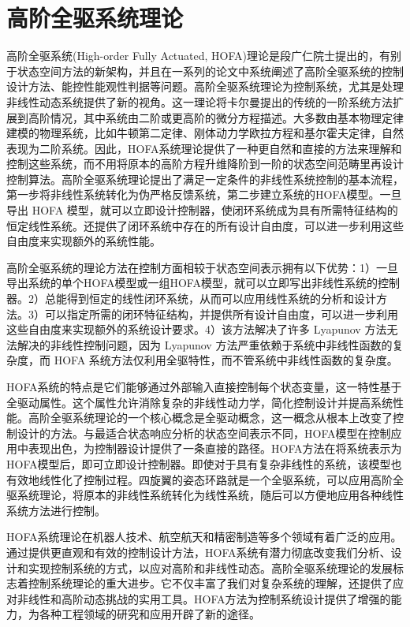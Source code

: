\section{高阶全驱系统理论}
高阶全驱系统(High-order Fully Actuated, HOFA)理论是段广仁院士提出的，有别于状态空间方法的新架构\cite{duan1}\cite{duan2}\cite{duan3}\cite{duan4}\cite{duan5}，并且在一系列的论文中系统阐述了高阶全驱系统的控制设计方法、能控性能观性判据等问题\cite{段1}\cite{段2}。高阶全驱系统理论为控制系统，尤其是处理非线性动态系统提供了新的视角。这一理论将卡尔曼提出的传统的一阶系统方法扩展到高阶情况，其中系统由二阶或更高阶的微分方程描述。大多数由基本物理定律建模的物理系统，比如牛顿第二定律、刚体动力学欧拉方程和基尔霍夫定律，自然表现为二阶系统。因此，HOFA系统理论提供了一种更自然和直接的方法来理解和控制这些系统，而不用将原本的高阶方程升维降阶到一阶的状态空间范畴里再设计控制算法。高阶全驱系统理论提出了满足一定条件的非线性系统控制的基本流程，第一步将非线性系统转化为伪严格反馈系统，第二步建立系统的HOFA模型。一旦导出 HOFA 模型，就可以立即设计控制器，使闭环系统成为具有所需特征结构的恒定线性系统。还提供了闭环系统中存在的所有设计自由度，可以进一步利用这些自由度来实现额外的系统性能。

高阶全驱系统的理论方法在控制方面相较于状态空间表示拥有以下优势：1）一旦导出系统的单个HOFA模型或一组HOFA模型，就可以立即写出非线性系统的控制器。2）总能得到恒定的线性闭环系统，从而可以应用线性系统的分析和设计方法。3）可以指定所需的闭环特征结构，并提供所有设计自由度，可以进一步利用这些自由度来实现额外的系统设计要求。4）该方法解决了许多 Lyapunov 方法无法解决的非线性控制问题，因为 Lyapunov 方法严重依赖于系统中非线性函数的复杂度，而 HOFA 系统方法仅利用全驱特性，而不管系统中非线性函数的复杂度。

HOFA系统的特点是它们能够通过外部输入直接控制每个状态变量，这一特性基于全驱动属性。这个属性允许消除复杂的非线性动力学，简化控制设计并提高系统性能。高阶全驱系统理论的一个核心概念是全驱动概念，这一概念从根本上改变了控制设计的方法。与最适合状态响应分析的状态空间表示不同，HOFA模型在控制应用中表现出色，为控制器设计提供了一条直接的路径。HOFA方法在将系统表示为HOFA模型后，即可立即设计控制器。即使对于具有复杂非线性的系统，该模型也有效地线性化了控制过程。四旋翼的姿态环路就是一个全驱系统，可以应用高阶全驱系统理论，将原本的非线性系统转化为线性系统，随后可以方便地应用各种线性系统方法进行控制。

HOFA系统理论在机器人技术、航空航天和精密制造等多个领域有着广泛的应用。通过提供更直观和有效的控制设计方法，HOFA系统有潜力彻底改变我们分析、设计和实现控制系统的方式，以应对高阶和非线性动态。高阶全驱系统理论的发展标志着控制系统理论的重大进步。它不仅丰富了我们对复杂系统的理解，还提供了应对非线性和高阶动态挑战的实用工具。HOFA方法为控制系统设计提供了增强的能力，为各种工程领域的研究和应用开辟了新的途径。
